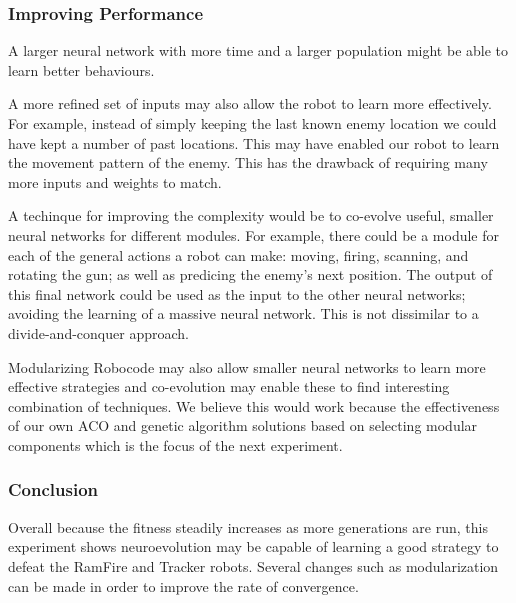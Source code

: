 \subsubsection{Improving Performance}
A larger neural network with more time and a larger population might be able to learn better behaviours.

A more refined set of inputs may also allow the robot to learn more effectively. For example, instead of simply keeping the last known enemy location we could have kept a number of past locations. This may have enabled our robot to learn the movement pattern of the enemy. This has the drawback of requiring many more inputs and weights to match.

A techinque for improving the complexity would be to co-evolve useful, smaller neural networks for different modules. For example, there could be a module for each of the general actions a robot can make: moving, firing, scanning, and rotating the gun; as well as predicing the enemy's next position.  The output of this final network could be used as the input to the other neural networks; avoiding the learning of a massive neural network. This is not dissimilar to a divide-and-conquer approach.

Modularizing Robocode may also allow smaller neural networks to learn more effective strategies and co-evolution may enable these to find interesting combination of techniques. We believe this would work because the effectiveness of our own ACO and genetic algorithm solutions based on selecting modular components which is the focus of the next experiment.


\subsubsection{Conclusion}
Overall because the fitness steadily increases as more generations are run, this experiment shows neuroevolution may be capable of learning a good strategy to defeat the RamFire and Tracker robots. Several changes such as modularization can be made in order to improve the rate of convergence.
